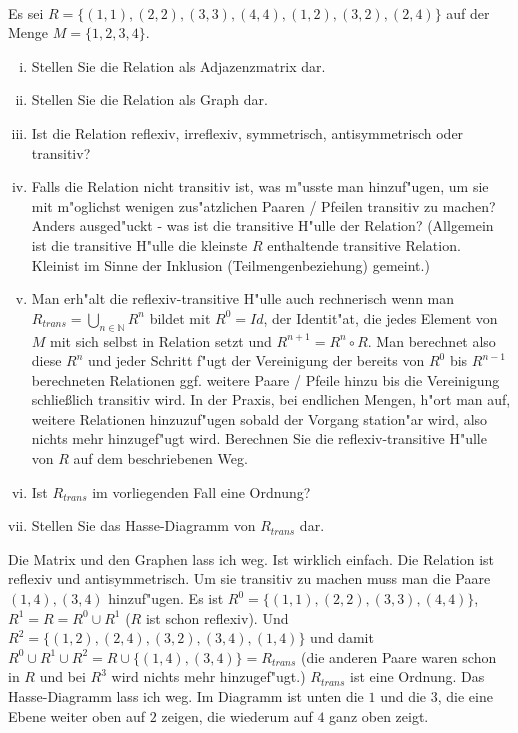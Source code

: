 \\
Es sei $R=\{(1,1),(2,2),(3,3),(4,4),(1,2),(3,2),(2,4)\}$ auf der Menge $M=\{1,2,3,4\}$.
\begin{enumerate}[(i)]
\item Stellen Sie die Relation als Adjazenzmatrix dar.
\item Stellen Sie die Relation als Graph dar.
\item Ist die Relation reflexiv, irreflexiv, symmetrisch, antisymmetrisch oder transitiv?
\item Falls die Relation nicht transitiv ist, was m"usste man hinzuf"ugen, um sie mit m"oglichst wenigen zus"atzlichen Paaren / Pfeilen transitiv zu machen? Anders ausged"uckt - was ist die transitive H"ulle der Relation? (Allgemein ist die transitive H"ulle die kleinste $R$ enthaltende transitive Relation. \glqq Klein\grqq ist im Sinne der Inklusion (Teilmengenbeziehung) gemeint.)
\item Man erh"alt die reflexiv-transitive H"ulle auch rechnerisch wenn man $R_{trans}=\bigcup_{n\in\mathbb{N}}R^n$ bildet mit $R^0=Id$, der Identit"at, die jedes Element von $M$ mit sich selbst in Relation setzt und $R^{n+1}=R^n\circ R$. Man berechnet also diese $R^n$ und jeder Schritt f"ugt der Vereinigung der bereits von $R^0$ bis $R^{n-1}$ berechneten Relationen ggf. weitere Paare / Pfeile hinzu bis die Vereinigung schlie\ss lich transitiv wird. In der Praxis, bei endlichen Mengen, h"ort man auf, weitere Relationen hinzuzuf"ugen sobald der Vorgang station"ar wird, also nichts mehr hinzugef"ugt wird. Berechnen Sie die reflexiv-transitive H"ulle von $R$ auf dem beschriebenen Weg.
\item Ist $R_{trans}$ im vorliegenden Fall eine Ordnung?
\item Stellen Sie das Hasse-Diagramm von $R_{trans}$ dar. 
\end{enumerate}

\begin{loesung}
Die Matrix und den Graphen lass ich weg. Ist wirklich einfach.
Die Relation ist reflexiv und antisymmetrisch.
Um sie transitiv zu machen muss man die Paare $(1,4),(3,4)$ hinzuf"ugen.
Es ist $R^0=\{(1,1),(2,2),(3,3),(4,4)\}$, $R^1=R=R^0\cup R^1$ ($R$ ist schon reflexiv). Und $R^2=\{(1,2),(2,4),(3,2),(3,4),(1,4)\}$ und damit $R^0\cup R^1\cup R^2=R\cup\{(1,4),(3,4)\}=R_{trans}$ (die anderen Paare waren schon in $R$ und bei $R^3$ wird nichts mehr hinzugef"ugt.)
$R_{trans}$ ist eine Ordnung. Das Hasse-Diagramm lass ich weg. Im Diagramm ist unten die $1$ und die $3$, die eine Ebene weiter oben auf $2$ zeigen, die wiederum auf $4$ ganz oben zeigt.
\end{loesung}

